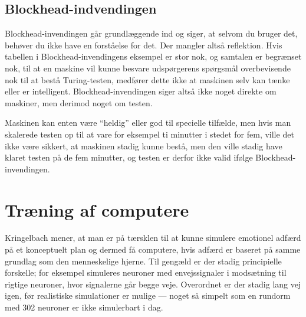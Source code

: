 \documentclass{article}
\begin{document}
\subsection{Blockhead-indvendingen}


Blockhead-invendingen går grundlæggende ind og siger, at selvom du bruger det, behøver du ikke have en forståelse for det. Der mangler altså reflektion.
Hvis tabellen i Blockhead-invendingens eksempel er stor nok, og samtalen er begrænset nok, til at en maskine vil kunne besvare udspørgerens spørgsmål overbevisende nok til at bestå Turing-testen, medfører dette ikke at maskinen selv kan tænke eller er intelligent. Blockhead-invendingen siger altså ikke noget direkte om maskiner, men derimod noget om testen.

Maskinen kan enten være ``heldig'' eller god til specielle tilfælde, men hvis man skalerede testen op til at vare for eksempel ti minutter i stedet for fem, ville det ikke være sikkert, at maskinen stadig kunne bestå, men den ville stadig have klaret testen på de fem minutter, og testen er derfor ikke valid ifølge Blockhead-invendingen.

\section{Træning af computere}
Kringelbach mener, at man er på tærsklen til at kunne simulere emotionel adfærd på et konceptuelt plan og dermed få computere, hvis adfærd er baseret på samme grundlag som den menneskelige hjerne. Til gengæld er der stadig principielle forskelle; for eksempel simuleres neuroner med envejssignaler i modsætning til rigtige neuroner, hvor signalerne går begge veje. Overordnet er der stadig lang vej igen, før realistiske simulationer er mulige --- noget så simpelt som en rundorm med 302 neuroner er ikke simulerbart i dag.
\end{document}
